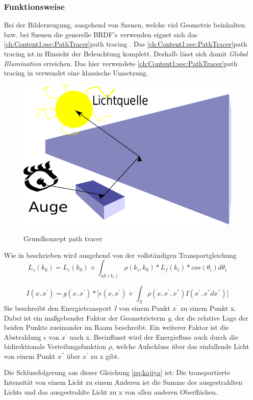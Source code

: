 \subsubsection{Funktionsweise}
Bei der Bilderzeugung, ausgehend von Szenen, welche viel Geometrie beinhalten bzw. bei Szenen 
die generelle BRDF's verwenden eignet sich das \ref{ch:Content1:sec:PathTracer}path tracing \cite{kajiya1986rendering}.
Das \ref{ch:Content1:sec:PathTracer}path tracing ist in Hinsicht der Beleuchtung komplett. Deshalb lässt sich damit
\textit{Global Illumination} erreichen. Das hier verwendete \ref{ch:Content1:sec:PathTracer}path tracing in 
\cite[eragae]{Benty18} verwendet eine klassische Umsetzung.\par

\begin{figure}[H]
    \centering
    \includegraphics[width=0.7\linewidth]{content/PathTracer/Bilder/Grundkonzept_path_tracing.pdf}
    \label{pic::PathTracingGrundkonzept}
    \caption{Grundkonzept path tracer}
\end{figure}


Wie in \cite{marschner2009fundamentals} beschrieben wird ausgehend von der vollständigen Transportgleichung
\begin{equation}\label{eq:vollstaendige Transportgleichung}
    L_s(k_0) = L_e(k_0) + \int_{all(k_i)}^{} \rho(k_i, k_0)*L_f(k_i)*cos(\theta_i)d\theta_i
\end{equation}
    
\begin{equation}\label{eq:kajiya}
        I(x,{x}^{'}) = g(x,{x}^{'}) * \biggl[\epsilon(x,{x}^{'}) + 
                        \int_{S}^{} \rho(x,{x}^{'},{x}^{''})
                        I({x}^{'},{x}^{''}d{x}^{''})\biggr] 
\end{equation}
Sie beschreibt den Energietransport \textit{I} von einem Punkt ${x}^{'}$
zu einem Punkt x. Dabei ist ein maßgebender Faktor der Geometrieterm \textit{g},
der die relative Lage der beiden Punkte zueinander im Raum beschreibt.
Ein weiterer Faktor ist die Abstrahlung \textit{$\epsilon$} von ${x}^{'}$ nach x. 
Beeinflusst wird der Energiefluss auch durch
die bidirektionale Verteilungsfunktion \textit{$\rho$}, welche Aufschluss über
das einfallende Licht von einem Punkt ${x}^{''}$ über ${x}^{'}$ zu x gibt.\par
Die Schlussfolgerung aus dieser Gleichung \ref{eq:kajiya} ist: Die transportierte
Intensität von einem Licht zu einem Anderen ist die Summe des ausgestrahlten Lichts 
und das ausgestrahlte Licht zu x von allen anderen Oberflächen.


